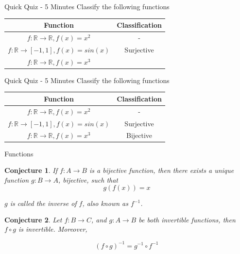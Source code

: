 \documentclass[aspectratio=169]{beamer}
\newtheorem{proposition}{Conjecture}[section]
\begin{document}
\begin{frame}{Quick Quiz - 5 Minutes}
    Classify the following functions
    \begin{center}
        \begin{tabular}{c|c}
            Function & Classification \\
            \hline
            $f:\mathbb{R}\rightarrow\mathbb{R}, f(x) = x^2$ & - \\
            $f:\mathbb{R}\rightarrow[-1,1], f(x) = sin(x)$ & Surjective \\
            $f:\mathbb{R}\rightarrow\mathbb{R}, f(x) = x^3$ & 
        \end{tabular}
    \end{center}
\end{frame}

\begin{frame}{Quick Quiz - 5 Minutes}
    Classify the following functions
    \begin{center}
        \begin{tabular}{c|c}
            Function & Classification \\
            \hline
            $f:\mathbb{R}\rightarrow\mathbb{R}, f(x) = x^2$ & - \\
            $f:\mathbb{R}\rightarrow[-1,1], f(x) = sin(x)$ & Surjective \\
            $f:\mathbb{R}\rightarrow\mathbb{R}, f(x) = x^3$ & Bijective
        \end{tabular}
    \end{center}
\end{frame}

\begin{frame}{Functions}
    \begin{proposition}
        If $f:A\rightarrow B$ is a bijective function, then there exists a unique function $g:B\rightarrow A$, bijective, such that $$g(f(x))=x$$
        
        $g$ is called the inverse of $f$, also known as $f^{-1}$.
    \end{proposition}
    
    \begin{proposition}
        Let $f:B\rightarrow C$, and $g:A\rightarrow B$ be both invertible functions, then $f\circ g$ is invertible. Moreover,
        
        $$(f\circ g)^{-1}=g^{-1}\circ f^{-1}$$
    \end{proposition}
    
\end{frame}
\end{document}
